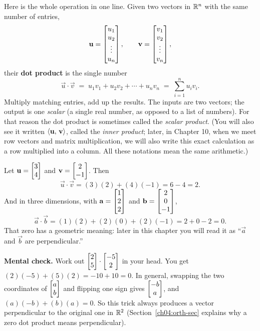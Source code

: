Here is the whole operation in one line. Given two vectors in $\mathbb{R}^n$ with the same
number of entries,
\[
  \mathbf{u} = \begin{bmatrix}u_1 \\ u_2 \\ \vdots \\ u_n\end{bmatrix}, \qquad
  \mathbf{v} = \begin{bmatrix}v_1 \\ v_2 \\ \vdots \\ v_n\end{bmatrix},
\]
their \textbf{dot product} is the single number
\[
  \vec{u}\cdot\vec{v} \;=\; u_1 v_1 + u_2 v_2 + \cdots + u_n v_n
  \;=\; \sum_{i=1}^{n} u_i v_i.
\]
Multiply matching entries, add up the results. The inputs are two vectors; the
output is one \emph{scalar} (a single real number, as opposed to a list of numbers).
For that reason the dot product is sometimes called the \emph{scalar product}.
(You will also see it written $\langle \mathbf{u},\, \mathbf{v} \rangle$, called the \emph{inner product};
later, in Chapter 10, when we meet row vectors and matrix multiplication, we will also
write this exact calculation as a row multiplied into a column. All these notations
mean the same arithmetic.)

\begin{example}\label{ch04:first-dot}
Let $\mathbf{u} = \begin{bmatrix}3 \\ 4\end{bmatrix}$ and $\mathbf{v} = \begin{bmatrix}2 \\ -1\end{bmatrix}$. Then
\[
  \vec u \cdot \vec v = (3)(2) + (4)(-1) = 6 - 4 = 2.
\]
And in three dimensions, with $\mathbf{a} = \begin{bmatrix}1\\2\\2\end{bmatrix}$ and
$\mathbf{b} = \begin{bmatrix}2\\0\\-1\end{bmatrix}$,
\[
  \vec a\cdot\vec b = (1)(2) + (2)(0) + (2)(-1) = 2 + 0 - 2 = 0.
\]
That zero has a geometric meaning: later in this chapter you will read it as
``$\vec a$ and $\vec b$ are perpendicular.''
\end{example}

\textbf{Mental check.} Work out $\begin{bmatrix}2\\5\end{bmatrix}\cdot\begin{bmatrix}-5\\2\end{bmatrix}$ in your head. You get
$(2)(-5) + (5)(2) = -10 + 10 = 0$. In general, swapping the two coordinates of
$\begin{bmatrix}a\\b\end{bmatrix}$ and flipping one sign gives $\begin{bmatrix}-b\\a\end{bmatrix}$, and
$(a)(-b) + (b)(a) = 0$. So this trick always produces a vector perpendicular to the
original one in $\mathbb{R}^2$ (Section~\ref{ch04:orth-sec} explains why a zero dot product
means perpendicular).

